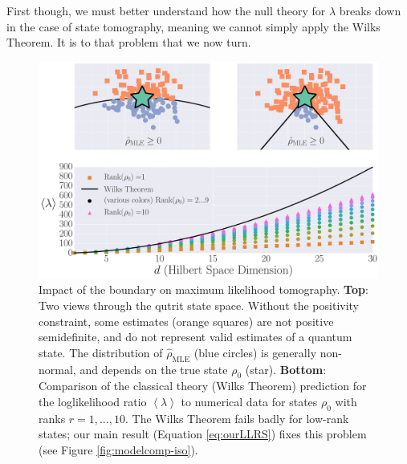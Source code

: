 \documentclass[aps,pra, twocolumn]{revtex4-1}
\newcommand{\expect}[1]{\ensuremath{\left\langle#1\right\rangle}}
\newcommand{\rhohat}{\hat{\rho}}
\newcommand{\rhoMLE}{\rhohat_{\scriptscriptstyle\mathrm{MLE}}}
\begin{document}
First though, we must better understand how the null theory for $\lambda$ breaks down in the case of state tomography, meaning we cannot simply apply the Wilks Theorem. It is to that problem that we now turn.

\begin{figure}[h]
\includegraphics[width=\columnwidth]{Images/Figure_1.pdf}
 \caption{Impact of the boundary on maximum likelihood tomography. \textbf{Top}: Two views through the qutrit state space. Without the positivity constraint, some estimates (orange squares) are not positive semidefinite, and do not represent valid estimates of a quantum state. The distribution of $\rhoMLE$ (blue circles) is generally non-normal, and depends on the true state $\rho_{0}$ (star).
\textbf{Bottom}:  Comparison of the classical theory (Wilks Theorem) prediction for the loglikelihood ratio $\expect{\lambda}$ to numerical data for states $\rho_{0}$ with ranks $r=1,\ldots ,10$.  The Wilks Theorem fails badly for low-rank states; our main result (Equation \ref{eq:ourLLRS}) fixes this problem (see Figure \ref{fig:modelcomp-iso}).}
\label{fig:boundaries}
\end{figure}
\end{document}
